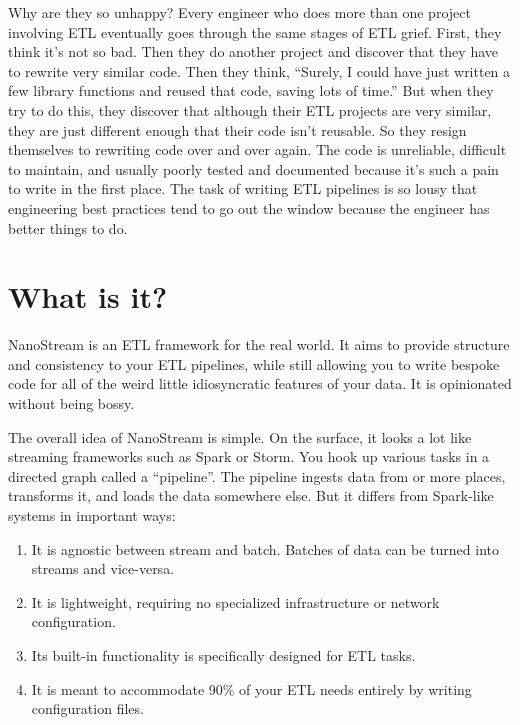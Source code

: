 \documentclass[letterpaper,10pt,english]{sphinxmanual}
\begin{document}
Why are they so unhappy? Every engineer who does more than one project involving
ETL eventually goes through the same stages of ETL grief. First, they think it’s
not so bad. Then they do another project and discover that they have to rewrite
very similar code. Then they think, “Surely, I could have just written a few
library functions and reused that code, saving lots of time.” But when they try
to do this, they discover that although their ETL projects are very similar,
they are just different enough that their code isn’t reusable. So they resign
themselves to rewriting code over and over again. The code is unreliable,
difficult to maintain, and usually poorly tested and documented because it’s
such a pain to write in the first place. The task of writing ETL pipelines is
so lousy that engineering best practices tend to go out the window because
the engineer has better things to do.


\section{What is it?}
\label{\detokenize{treehorn:what-is-it}}
NanoStream is an ETL framework for the real world. It aims to provide structure and consistency to your ETL pipelines, while still allowing you to write bespoke code for all of the weird little idiosyncratic features of your data. It is opinionated without being bossy.

The overall idea of NanoStream is simple. On the surface, it looks a lot like streaming frameworks such as Spark or Storm. You hook up various tasks in a directed graph called a “pipeline”. The pipeline ingests data from or more places, transforms it, and loads the data somewhere else. But it differs from Spark-like systems in important ways:
\begin{enumerate}
\def\theenumi{\arabic{enumi}}
\def\labelenumi{\theenumi .}
\makeatletter\def\p@enumii{\p@enumi \theenumi .}\makeatother
\item {} 
It is agnostic between stream and batch. Batches of data can be turned into streams and vice-versa.

\item {} 
It is lightweight, requiring no specialized infrastructure or network configuration.

\item {} 
Its built-in functionality is specifically designed for ETL tasks.

\item {} 
It is meant to accommodate 90\% of your ETL needs entirely by writing configuration files.

\end{enumerate}
\end{document}
